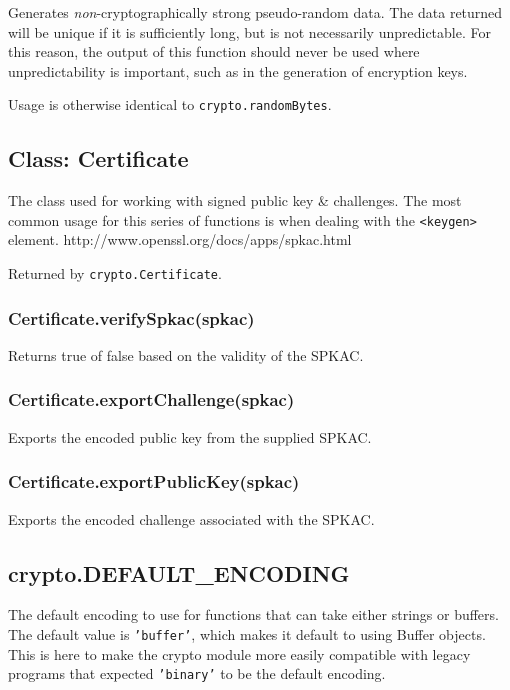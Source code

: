 Generates \emph{non}-cryptographically strong pseudo-random data. The
data returned will be unique if it is sufficiently long, but is not
necessarily unpredictable. For this reason, the output of this function
should never be used where unpredictability is important, such as in the
generation of encryption keys.

Usage is otherwise identical to \texttt{crypto.randomBytes}.

\subsection{Class: Certificate}\label{class-certificate}

The class used for working with signed public key \& challenges. The
most common usage for this series of functions is when dealing with the
\texttt{\textless{}keygen\textgreater{}} element.
http://www.openssl.org/docs/apps/spkac.html

Returned by \texttt{crypto.Certificate}.

\subsubsection{Certificate.verifySpkac(spkac)}\label{certificate.verifyspkacspkac}

Returns true of false based on the validity of the SPKAC.

\subsubsection{Certificate.exportChallenge(spkac)}\label{certificate.exportchallengespkac}

Exports the encoded public key from the supplied SPKAC.

\subsubsection{Certificate.exportPublicKey(spkac)}\label{certificate.exportpublickeyspkac}

Exports the encoded challenge associated with the SPKAC.

\subsection{crypto.DEFAULT\_ENCODING}\label{crypto.defaultux5fencoding}

The default encoding to use for functions that can take either strings
or buffers. The default value is \texttt{'buffer'}, which makes it
default to using Buffer objects. This is here to make the crypto module
more easily compatible with legacy programs that expected
\texttt{'binary'} to be the default encoding.

